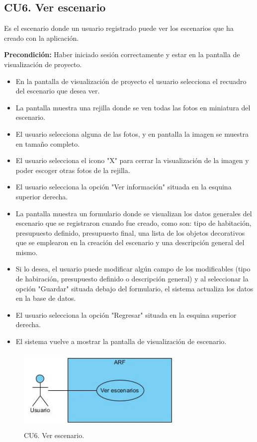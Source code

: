 \subsection{CU6. Ver escenario}\par
Es el escenario donde un usuario registrado puede ver los escenarios que ha creado con la aplicación.\par
\textbf{Precondición:} Haber iniciado sesión correctamente y estar en la pantalla de visualización de proyecto.\par
\begin{itemize}
	\item En la pantalla de visualización de proyecto el usuario selecciona el recuadro del escenario que desea ver.
	\item La pantalla muestra una rejilla donde se ven todas las fotos en miniatura del escenario.
	\item El usuario selecciona alguna de las fotos, y en pantalla la imagen se muestra en tamaño completo.
	\item El usuario selecciona el icono "X" para cerrar la visualización de la imagen y poder escoger otras fotos de la rejilla.
	\item El usuario selecciona la opción "Ver información" situada en la esquina superior derecha.
	\item La pantalla muestra un formulario donde se visualizan los datos generales del escenario que se registraron cuando fue creado, como son: tipo de habitación, presupuesto definido, presupuesto final, una lista de los objetos decorativos que se emplearon en la creación del escenario y una descripción general del mismo.
	\item Si lo desea, el usuario puede modificar algún campo de los modificables (tipo de habiración, presupuesto definido o descripción general) y al seleccionar la opción "Guardar" situada debajo del formulario, el sistema actualiza los datos en la base de datos.
	\item El usuario selecciona la opción "Regresar" situada en la esquina superior derecha.
	\item El sistema vuelve a mostrar la pantalla de visualización de escenario.
\end{itemize}

\begin{figure}[h!]
	\centering
	\includegraphics[width=8cm,height=4cm]{imagenes/analisis/cu/ver_escenarios.jpg}
	\caption{CU6. Ver escenario.}
	\label{fig:verescenario}
\end{figure} 

